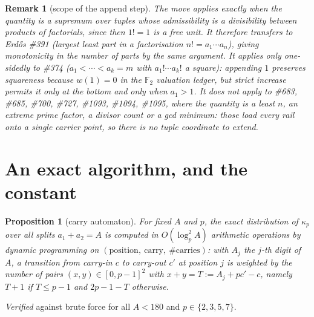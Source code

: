 \documentclass[11pt]{article}
\newtheorem{proposition}[theorem]{Proposition}
\newtheorem{remark}[theorem]{Remark}
\begin{document}
\begin{remark}[scope of the append step]\label{rem:scope}
The move applies exactly when the quantity is a supremum over tuples whose admissibility is
a divisibility between products of factorials, since then $1!=1$ is a free unit.  It
therefore transfers to Erd\H{o}s \#391 (largest least part in a factorisation $n!=a_1\cdots
a_n$), giving monotonicity in the number of parts by the same argument.  It applies only
one-sidedly to \#374 ($a_1<\cdots<a_k=m$ with $a_1!\cdots a_k!$ a square): appending $1$
preserves squareness because $w(1)=0$ in the $\mathbb F_2$ valuation ledger, but strict
increase permits it only at the bottom and only when $a_1>1$.  It does not apply to
\#683, \#685, \#700, \#727, \#1093, \#1094, \#1095, where the quantity is a least $n$, an
extreme prime factor, a divisor count or a gcd minimum: those load every rail onto a single
carrier point, so there is no tuple coordinate to extend.
\end{remark}

\section{An exact algorithm, and the constant}

\begin{proposition}[carry automaton]\label{prop:dp}
For fixed $A$ and $p$, the exact distribution of $\kappa_p$ over all splits
$a_1+a_2=A$ is computed in $O(\log^2_pA)$ arithmetic operations by dynamic programming on
$(\text{position},\ \text{carry},\ \#\text{carries})$: with $A_j$ the $j$-th digit of $A$,
a transition from carry-in $c$ to carry-out $c'$ at position $j$ is weighted by the number
of pairs $(x,y)\in[0,p-1]^2$ with $x+y=T:=A_j+pc'-c$, namely $T+1$ if $T\le p-1$ and
$2p-1-T$ otherwise.
\end{proposition}

\emph{Verified} against brute force for all $A<180$ and $p\in\{2,3,5,7\}$.
\end{document}
